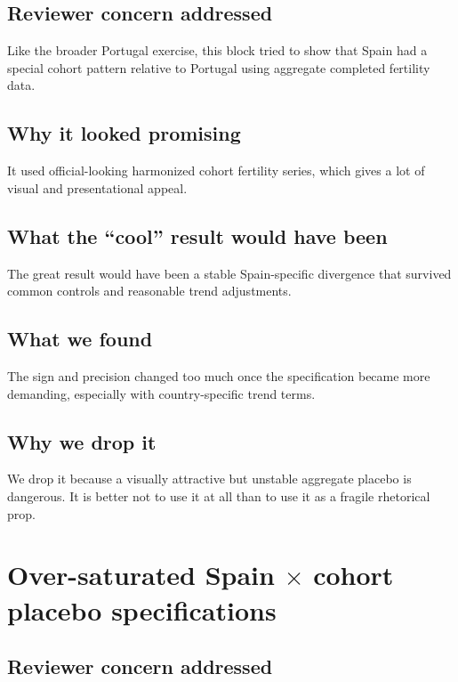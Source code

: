 \documentclass[11pt]{article}
\begin{document}
\subsection*{Reviewer concern addressed}

Like the broader Portugal exercise, this block tried to show that Spain had a special cohort pattern relative to Portugal using aggregate completed fertility data.

\subsection*{Why it looked promising}

It used official-looking harmonized cohort fertility series, which gives a lot of visual and presentational appeal.

\subsection*{What the ``cool'' result would have been}

The great result would have been a stable Spain-specific divergence that survived common controls and reasonable trend adjustments.

\subsection*{What we found}

The sign and precision changed too much once the specification became more demanding, especially with country-specific trend terms.

\subsection*{Why we drop it}

We drop it because a visually attractive but unstable aggregate placebo is dangerous. It is better not to use it at all than to use it as a fragile rhetorical prop.

\section{Over-saturated Spain $\times$ cohort placebo specifications}

\subsection*{Reviewer concern addressed}
\end{document}
